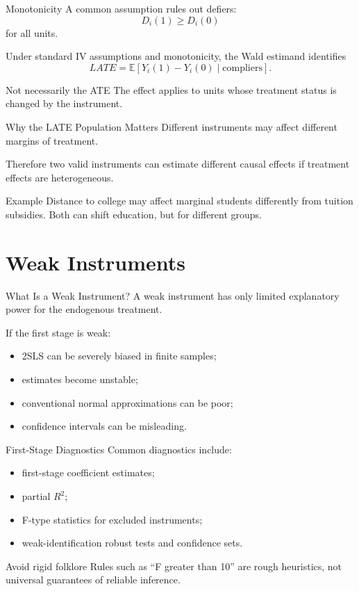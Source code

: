 \documentclass[aspectratio=169,11pt]{beamer}
\newcommand{\E}{\mathbb{E}}
\begin{document}
\begin{frame}{Monotonicity}
A common assumption rules out defiers:
\[
D_i(1)\geq D_i(0)
\]
for all units.

Under standard IV assumptions and monotonicity, the Wald estimand identifies
\[
LATE
=
\E[Y_i(1)-Y_i(0)\mid \text{compliers}].
\]

\begin{alertblock}{Not necessarily the ATE}
The effect applies to units whose treatment status is changed by the instrument.
\end{alertblock}
\end{frame}

\begin{frame}{Why the LATE Population Matters}
Different instruments may affect different margins of treatment.

Therefore two valid instruments can estimate different causal effects if treatment effects are heterogeneous.

\begin{block}{Example}
Distance to college may affect marginal students differently from tuition subsidies. Both can shift education, but for different groups.
\end{block}
\end{frame}

\section{Weak Instruments}

\begin{frame}{What Is a Weak Instrument?}
A weak instrument has only limited explanatory power for the endogenous treatment.

If the first stage is weak:
\begin{itemize}
\item 2SLS can be severely biased in finite samples;
\item estimates become unstable;
\item conventional normal approximations can be poor;
\item confidence intervals can be misleading.
\end{itemize}
\end{frame}

\begin{frame}{First-Stage Diagnostics}
Common diagnostics include:
\begin{itemize}
\item first-stage coefficient estimates;
\item partial \(R^2\);
\item F-type statistics for excluded instruments;
\item weak-identification robust tests and confidence sets.
\end{itemize}

\begin{alertblock}{Avoid rigid folklore}
Rules such as “F greater than 10” are rough heuristics, not universal guarantees of reliable inference.
\end{alertblock}
\end{frame}
\end{document}
